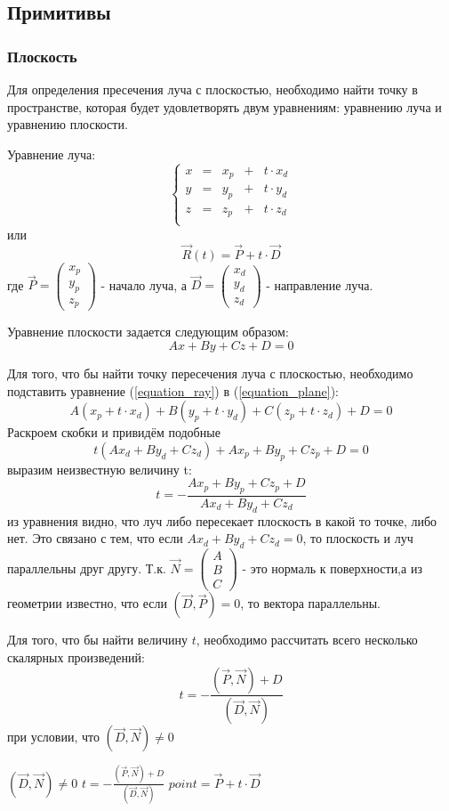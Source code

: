 \documentclass[12pt, a4paper]{article}
\def\VEC#1#2#3{\left( \begin{array}{c} #1 \\ #2 \\ #3 \end{array} \right) }
\def\VECXYZ#1{\left( \begin{array}{c} x_#1 \\ y_#1 \\ z_#1 \end{array} \right) }
\begin{document}
\subsection{Примитивы}
\subsubsection{Плоскость}
Для определения пресечения луча с плоскостью, необходимо найти точку в пространстве, которая будет удовлетворять двум уравнениям: уравнению луча и уравнению плоскости.
\par
Уравнение луча:
\begin{equation}
\left\{
\begin{array}{ccccc}
x & = & x_p & + & t \cdot x_d \\
y & = & y_p & + & t \cdot y_d \\
z & = & z_p & + & t \cdot z_d \\
\end{array}
\right.
\label{equation_ray}
\end{equation}
или
$$
\vec{R}(t) = \vec{P} + t \cdot \vec{D}
$$
где $\vec{P} = \VECXYZ{p} $ - начало луча, а $\vec{D} = \VECXYZ{d} $ - направление луча. 
\par
Уравнение плоскости задается следующим образом:
\begin{equation}
Ax + By + Cz + D = 0
\label{equation_plane}
\end{equation}
\par
Для того, что бы найти точку пересечения луча с плоскостью, необходимо подставить уравнение (\ref{equation_ray}) в (\ref{equation_plane}):
$$
A(x_p + t \cdot x_d) + B(y_p + t \cdot y_d) + C(z_p + t \cdot z_d) + D = 0
$$
Раскроем скобки и привидём подобные
$$
t(Ax_d + By_d + Cz_d ) + Ax_p + By_p + Cz_p + D = 0
$$
выразим неизвестную величину t:
$$
 t = - \frac{Ax_p + By_p + Cz_p + D}{Ax_d + By_d + Cz_d}
$$
из уравнения видно, что луч либо пересекает плоскость в какой то точке, либо нет. Это связано с тем, что если $Ax_d + By_d + Cz_d = 0$, то плоскость и луч параллельны друг другу. Т.к. $\vec{N} = \VEC{A}{B}{C} $ - это нормаль к поверхности,а из геометрии известно, что если $( \vec{D} , \vec{P} ) = 0$, то вектора параллельны.
\par
   Для того, что бы найти величину $t$, необходимо рассчитать всего несколько скалярных произведений:
$$
t = - \frac{(\vec{P}, \vec{N}) + D}{(\vec{D}, \vec{N})}
$$
при условии, что $(\vec{D}, \vec{N}) \neq 0$
\begin{codebox}
\li \If $(\vec{D}, \vec{N}) \neq 0$
\li \Then $ t = - \displaystyle\frac{(\vec{P}, \vec{N}) + D}{(\vec{D}, \vec{N})} $
\li $point = \vec{P} + t \cdot \vec{D}$
\end{codebox}
\end{document}
